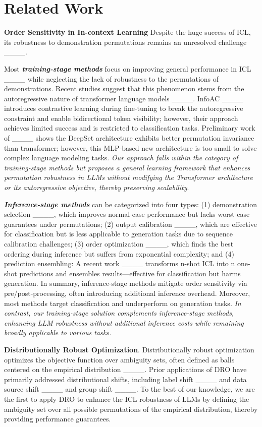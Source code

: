 \section{Related Work}
\textbf{Order Sensitivity in In-context Learning} 
Despite the huge success of ICL, its robustness to demonstration permutations remains an unresolved challenge 
____.

Most \textbf{\textit{training-stage methods}} focus on improving general performance in ICL ____ while neglecting the lack of robustness to the permutations of demonstrations. Recent studies suggest that this phenomenon stems from the autoregressive nature of transformer language models ____.
InfoAC ____ introduces contrastive learning during fine-tuning to break the autoregressive constraint and enable bidirectional token visibility; however, their approach achieves limited success and is restricted to classification tasks. Preliminary work of ____ shows the DeepSet architecture exhibits better permutation invariance than transformer; however, this MLP-based new architecture is too small to solve complex language modeling tasks.
\textit{Our approach falls within the category of training-stage methods but proposes a general learning framework that enhances permutation robustness in LLMs without modifying the Transformer architecture or its autoregressive objective, thereby preserving scalability}.

\textbf{\textit{Inference-stage methods}} can be categorized into four types: 
(1) demonstration selection ____, 
which improves normal-case performance but lacks worst-case guarantees under permutations; 
(2) output calibration ____, which are effective for classification but is less applicable to generation tasks due to sequence calibration challenges; (3) order optimization ____, which finds the best ordering during inference but suffers from exponential complexity; and (4) prediction ensembling: 
A recent work ____ transforms n-shot ICL into n one-shot predictions and ensembles results—effective for classification but harms generation.
In summary, inference-stage methods mitigate order sensitivity via pre/post-processing, often introducing additional inference overhead. Moreover, most methods target classification and underperform on generation tasks.
\textit{In contrast, our training-stage solution complements inference-stage methods, enhancing LLM robustness without additional inference costs while remaining broadly applicable to various tasks.}



\noindent \textbf{Distributionally Robust Optimization}.
Distributionally robust optimization optimizes the objective function over ambiguity sets, often defined as balls centered on the empirical distribution ____. 
Prior applications of DRO have primarily addressed distributional shifts, including label shift ____ and data source shift ____ and group shift ____. 
To the best of our knowledge, we are the first to apply DRO to enhance the ICL robustness of LLMs by defining the ambiguity set over all possible permutations of the empirical distribution, thereby providing performance guarantees.

